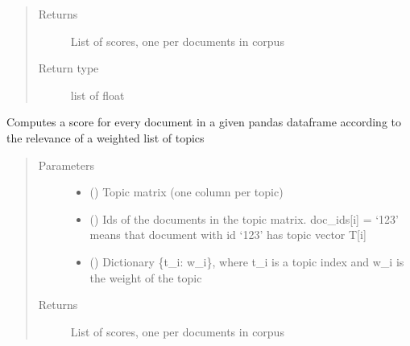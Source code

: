 \documentclass[letterpaper,10pt,english]{sphinxmanual}
\begin{document}
\begin{fulllineitems}
\begin{fulllineitems}
\begin{quote}
\begin{description}
\begin{itemize}
\end{itemize}

\item[{Returns}] \leavevmode
\sphinxAtStartPar
{} \textendash{} List of scores, one per documents in corpus

\item[{Return type}] \leavevmode
\sphinxAtStartPar
list of float

\end{description}\end{quote}

\end{fulllineitems}


\begin{fulllineitems}
\label{\detokenize{dc_preprocessor:src.domain_classifier.preprocessor.CorpusDFProcessor.score_by_topics}}
\sphinxAtStartPar
Computes a score for every document in a given pandas dataframe
according to the relevance of a weighted list of topics
\begin{quote}\begin{description}
\item[{Parameters}] \leavevmode\begin{itemize}
\item {} 
\sphinxAtStartPar
{} () \textendash{} Topic matrix (one column per topic)

\item {} 
\sphinxAtStartPar
{} () \textendash{} Ids of the documents in the topic matrix. doc\_ids{[}i{]} = ‘123’ means
that document with id ‘123’ has topic vector T{[}i{]}

\item {} 
\sphinxAtStartPar
{} () \textendash{} Dictionary \{t\_i: w\_i\}, where t\_i is a topic index and w\_i is the
weight of the topic

\end{itemize}

\item[{Returns}] \leavevmode
\sphinxAtStartPar
{} \textendash{} List of scores, one per documents in corpus


\end{description}
\end{quote}
\end{fulllineitems}
\end{fulllineitems}
\end{document}
